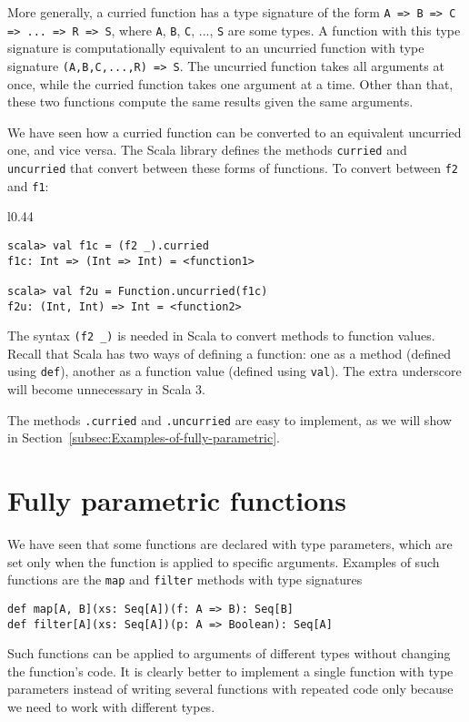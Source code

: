 More generally, a curried function has a type signature of the form
\lstinline!A => B => C => ... => R => S!, where \lstinline!A!, \lstinline!B!,
\lstinline!C!, ..., \lstinline!S! are some types. A function with
this type signature is computationally equivalent to an uncurried
function with type signature \lstinline!(A,B,C,...,R) => S!. The
uncurried function takes all arguments at once, while the curried
function takes one argument at a time. Other than that, these two
functions compute the same results given the same arguments.

We have seen how a curried function can be converted to an equivalent
uncurried one, and vice versa. The Scala library defines the methods
\lstinline!curried! and \lstinline!uncurried! that convert between
these forms of functions. To convert between \lstinline!f2! and \lstinline!f1!:

\begin{wrapfigure}{l}{0.44\columnwidth}%
\vspace{-0.5\baselineskip}
\begin{lstlisting}
scala> val f1c = (f2 _).curried
f1c: Int => (Int => Int) = <function1>

scala> val f2u = Function.uncurried(f1c)
f2u: (Int, Int) => Int = <function2> 
\end{lstlisting}
\vspace{-0.95\baselineskip}
\end{wrapfigure}%

\noindent The syntax \lstinline!(f2 _)! is needed in Scala to convert
methods to function values. Recall that Scala has two ways of defining
a function: one as a method (defined using \lstinline!def!),
another as a function value (defined using
\lstinline!val!). The extra underscore will become unnecessary in
Scala 3.

The methods \lstinline!.curried! and \lstinline!.uncurried! are
easy to implement, as we will show in Section~\ref{subsec:Examples-of-fully-parametric}.

\section{Fully parametric functions\label{sec:Fully-parametric-functions}}

We have seen that some functions are declared with type parameters,
which are set only when the function is applied to specific arguments.
Examples of such functions are the \lstinline!map! and \lstinline!filter!
methods with type signatures
\begin{lstlisting}
def map[A, B](xs: Seq[A])(f: A => B): Seq[B]
def filter[A](xs: Seq[A])(p: A => Boolean): Seq[A]
\end{lstlisting}
Such functions can be applied to arguments of different types without
changing the function's code. It is clearly better to implement a
single function with type parameters instead of writing several functions
with repeated code only because we need to work with different types.

